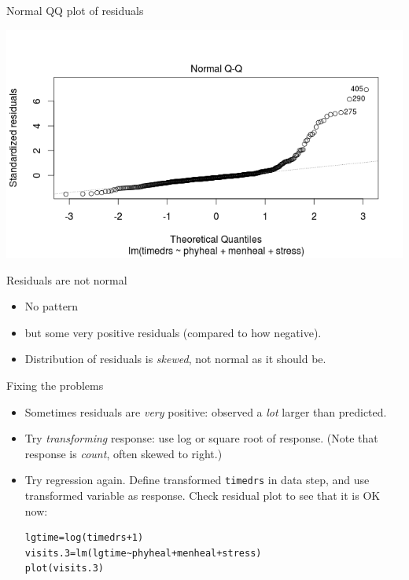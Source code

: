 \documentclass{beamer}
\begin{document}
\begin{frame}[fragile]{Normal QQ plot of residuals}

\includegraphics[width=\textwidth]{regressx1a}
  
\end{frame}

\begin{frame}{Residuals are not normal}

  \begin{itemize}
  \item No pattern
  \item but some very positive residuals (compared to
how negative).
\item Distribution of residuals is {\em skewed}, not
normal as it should be.
  \end{itemize}
\end{frame}


\begin{frame}[fragile]{Fixing the problems}

  \begin{itemize}
  \item Sometimes residuals are {\em very} positive: observed a {\em lot} larger than predicted.
  \item Try {\em  transforming} response: use log or square root of response. (Note that response is {\em count}, often skewed to right.)
  \item Try regression again. Define transformed \verb-timedrs- in data step, and use transformed variable as response. Check residual plot to see that it is OK now:

{\footnotesize
\begin{verbatim}
lgtime=log(timedrs+1)
visits.3=lm(lgtime~phyheal+menheal+stress)
plot(visits.3)
\end{verbatim}
}
  \end{itemize}
  
\end{frame}
\end{document}
